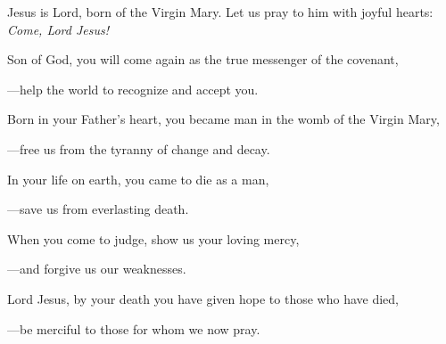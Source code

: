 \intercessions\indent

\begin{hangpar}

Jesus is Lord, born of the Virgin Mary. Let us pray to him with joyful hearts:\\
\emph{Come, Lord Jesus!}

\medskip Son of God, you will come again as the true messenger of the covenant,

{\color{red}---\thinspace}help the world to recognize and accept you.

\medskip Born in your Father’s heart, you became man in the womb of the Virgin Mary,

{\color{red}---\thinspace}free us from the tyranny of change and decay.

\medskip In your life on earth, you came to die as a man,

{\color{red}---\thinspace}save us from everlasting death.

\medskip When you come to judge, show us your loving mercy,

{\color{red}---\thinspace}and forgive us our weaknesses.

\medskip Lord Jesus, by your death you have given hope to those who have died,

{\color{red}---\thinspace}be merciful to those for whom we now pray.

\end{hangpar}